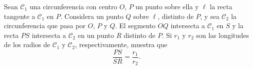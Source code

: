 Sean $\mathcal{C}_1$ una circunferencia con centro $O$, $P$ un punto sobre ella y $\ell$ la recta tangente a $\mathcal{C}_1$ en $P$. Considera un punto $Q$ sobre $\ell$, distinto de $P$, y sea $\mathcal{C}_2$ la circunferencia que pasa por $O$, $P$ y $Q$. El segmento $OQ$ intersecta a $\mathcal{C}_1$ en $S$ y la recta $PS$ intersecta a $\mathcal{C}_2$ en un punto $R$ distinto de $P$. Si $r_1$ y $r_2$ son las longitudes de los radios de $\mathcal{C}_1$ y $\mathcal{C}_2$, respectivamente, muestra que
\[\frac{PS}{SR}=\frac{r_1}{r_2}.\]